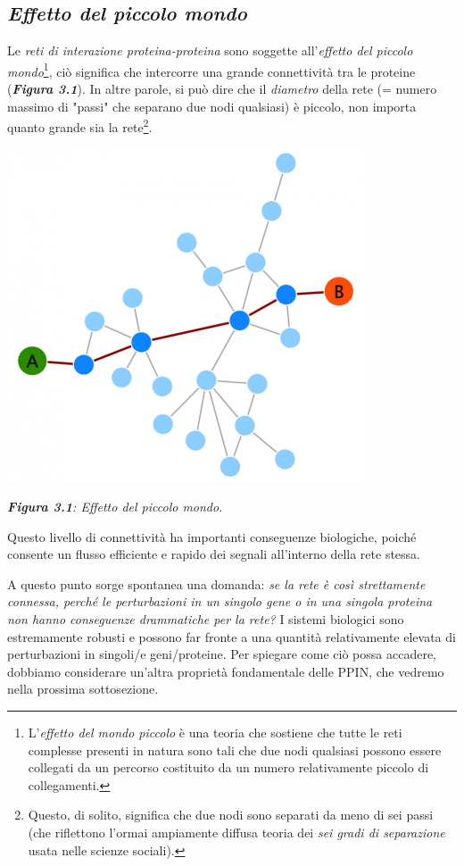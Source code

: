 \documentclass[11pt]{article}
\begin{document}
\subsection{\textit{Effetto del piccolo mondo}}
Le \textit{reti di interazione proteina-proteina} sono soggette all'\textit{effetto del piccolo mondo}\footnote{L'\textit{effetto del mondo piccolo} è una teoria che sostiene che tutte le reti complesse presenti in natura sono tali che due nodi qualsiasi possono essere collegati da un percorso costituito da un numero relativamente piccolo di collegamenti.}, ciò significa che intercorre una grande connettività tra le proteine (\textit{\textbf{Figura 3.1}}). In altre parole, si può dire che il \textit{diametro} della rete (= numero massimo di "passi" che separano due nodi qualsiasi) è piccolo, non importa quanto grande sia la rete\footnote{Questo, di solito, significa che due nodi sono separati da meno di sei passi (che riflettono l'ormai ampiamente diffusa teoria dei \textit{sei gradi di separazione} usata nelle scienze sociali).}.

\begin{center}
\includegraphics[scale=0.4]{grafo}

\begin{small}\textit{\textbf{Figura 3.1}: Effetto del piccolo mondo}.\end{small}
\end{center}

Questo livello di connettività ha importanti conseguenze biologiche, poiché consente un flusso efficiente e rapido dei segnali all'interno della rete stessa. 

A questo punto sorge spontanea una domanda: \textit{se la rete è così strettamente connessa, perché le perturbazioni in un singolo gene o in una singola proteina non hanno conseguenze drammatiche per la rete?} I sistemi biologici sono estremamente robusti e possono far fronte a una quantità relativamente elevata di perturbazioni in singoli/e geni/proteine. Per spiegare come ciò possa accadere, dobbiamo considerare un'altra proprietà fondamentale delle PPIN, che vedremo nella prossima sottosezione.
\end{document}
